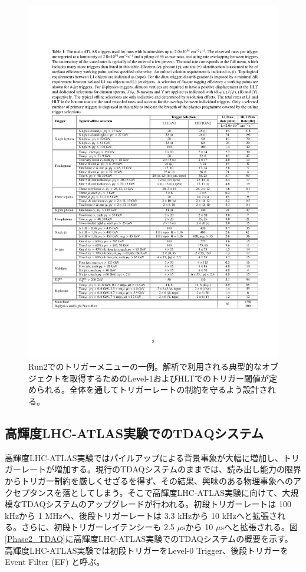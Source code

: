     \begin{figure} 
    \centering
    \includegraphics[width=16cm]{fig/Intro/Run2_Triggermenu.pdf}
    \caption[Run2でのトリガーメニューの一例]{Run2でのトリガーメニューの一例\cite{Run2_Triggermenu}。解析で利用される典型的なオブジェクトを取得するためのLevel-1およびHLTでのトリガー閾値が定められる。全体を通してトリガーレートの制約を守るよう設計される。}
    \label{Run2_Triggermenu}
    \end{figure}

    \subsection{高輝度LHC-ATLAS実験でのTDAQシステム}
高輝度LHC-ATLAS実験ではパイルアップによる背景事象が大幅に増加し、トリガーレートが増加する。現行のTDAQシステムのままでは、読み出し能力の限界からトリガー制約を厳しくせざるを得ず、その結果、興味のある物理事象へのアクセプタンスを落としてしまう。そこで高輝度LHC-ATLAS実験に向けて、大規模なTDAQシステムのアップグレードが行われる。初段トリガーレートは 100 kHzから 1 MHzへ、後段トリガーレートは 3.3 kHzから 10 kHzへと拡張される。さらに、初段トリガーレイテンシーも 2.5 $\mu\mathrm{s}$から 10 $\mu\mathrm{s}$へと拡張される。図\ref{Phase2_TDAQ}に高輝度LHC-ATLAS実験でのTDAQシステムの概要を示す。
高輝度LHC-ATLAS実験では初段トリガーをLevel-0 Trigger、後段トリガーをEvent Filter (EF) と呼ぶ。

